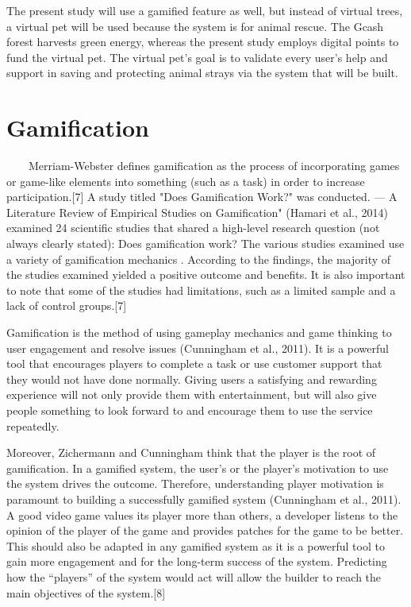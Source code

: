 The present study will use a gamified feature as well, but instead of virtual trees, a virtual pet will be used because the system is for animal rescue. The Gcash forest harvests green energy, whereas the present study employs digital points to fund the virtual pet. The virtual pet's goal is to validate every user's help and support in saving and protecting animal strays via the system that will be built.

\section{Gamification}

~~~~Merriam-Webster defines gamification as the process of incorporating games or game-like elements into something (such as a task) in order to increase participation.[7]  A study titled "Does Gamification Work?" was conducted. — A Literature Review of Empirical Studies on Gamification" (Hamari et al., 2014) examined 24 scientific studies that shared a high-level research question (not always clearly stated): Does gamification work? The various studies examined use a variety of gamification mechanics . According to the findings, the majority of the studies examined yielded a positive outcome and benefits. It is also important to note that some of the studies had limitations, such as a limited sample and a lack of control groups.[7] 

Gamification is the method of using gameplay mechanics and game thinking to user engagement and resolve issues (Cunningham et al., 2011). It is a powerful tool that encourages players to complete a task or use customer support that they would not have done normally. Giving users a satisfying and rewarding experience will not only provide them with entertainment, but will also give people something to look forward to and encourage them to use the service repeatedly.

Moreover, Zichermann and Cunningham think that the player is the root of gamification. In a gamified system, the user’s or the player’s motivation to use the system drives the outcome. Therefore, understanding player motivation is paramount to building a successfully gamified system (Cunningham et al., 2011). A good video game values its player more than others, a developer listens to the opinion of the player of the game and provides patches for the game to be better. This should also be adapted in any gamified system as it is a powerful tool to gain more engagement and for the long-term success of the system. Predicting how the “players” of the system would act will allow the builder to reach the main objectives of the system.[8]

